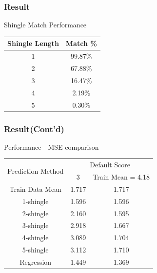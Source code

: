 \documentclass[11pt]{beamer}
\begin{document}
\begin{frame}
\frametitle{Result}

	\centering
	Shingle Match Performance

	\begin{center}
		\begin{tabular}{cc}
			\toprule
				Shingle Length & Match \% \\
			\midrule
				1 & 99.87\% \\
				2 & 67.88\% \\
				3 & 16.47\% \\
				4 & 2.19\% \\
				5 & 0.30\% \\
			\bottomrule
		\end{tabular}
	\end{center}
	\vspace{5mm}




\end{frame}

\begin{frame}
\frametitle{Result(Cont'd)}

	\centering
	Performance - MSE comparison

	\begin{center}

		\begin{tabular}{ccc}
			\toprule
				\multirow{2}{*}{Prediction Method} &
				\multicolumn{2}{c}{Default Score}\\
				\cline{2-3}
				& 3 & Train Mean = 4.18 \\
			\midrule
				Train Data Mean & 1.717 & 1.717 \\
				\hline
				1-shingle & 1.596 & 1.596\\
				2-shingle & 2.160 & 1.595\\
				3-shingle & 2.918 & 1.667\\
				4-shingle & 3.089 & 1.704\\
				5-shingle & 3.112 & 1.710\\
				\hline
				Regression & 1.449 & 1.369\\

			\bottomrule
		\end{tabular}
	\end{center}
	\vspace{5mm}

\end{frame}
\end{document}
